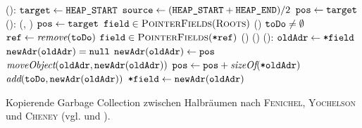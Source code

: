 \begin{algorithm}[h]
\begin{algorithmic}[1]
	\State {}():
	\State \quad $\texttt{target} \gets \texttt{HEAP\_START}$		
	\State \quad $\texttt{source} \gets (\texttt{HEAP\_START} + \texttt{HEAP\_END}) / 2$		
	\State \quad $\texttt{pos} \gets \texttt{target}$		
	\Statex
	\State \Atomic {}():
	\State \quad {}(, )		
	\State \quad $\texttt{pos} \gets \texttt{target}$
	\State \quad \FOREACH $\texttt{field} \in \textsc{PointerFields}(\textsc{Roots})$		
	\State \quad \quad {}()		
	\State \quad \WHILE $\texttt{toDo} \neq \emptyset$		
	\State \quad \quad $\texttt{ref} \gets \textit{remove}(\texttt{toDo})$	
	\State \quad \quad \FOREACH $\texttt{field} \in \textsc{PointerFields}(\texttt{*ref})$
	\State \quad \quad \quad {}()	
	\State \quad {}()
	\Statex
	\State {}():
	\State \quad $\texttt{oldAdr} \gets \texttt{*field}$		
	\State \quad \IF $\texttt{newAdr}(\texttt{oldAdr}) = \texttt{null}$	
	\State \quad \quad $\texttt{newAdr}(\texttt{oldAdr}) \gets \texttt{pos}$		
	\State \quad \quad $\textit{moveObject}(\texttt{oldAdr}, \texttt{newAdr}(\texttt{oldAdr}))$
	\State \quad \quad $\texttt{pos} \gets \texttt{pos} + \textit{sizeOf}(\texttt{*oldAdr})$	
	\State \quad \quad $\textit{add}(\texttt{toDo}, \texttt{newAdr}(\texttt{oldAdr}))$	
	\State \quad $\texttt{*field} \gets \texttt{newAdr}(\texttt{oldAdr})$	
\end{algorithmic}
\caption[Kopierende Garbage Collection nach \textsc{Fenichel}, \textsc{Yochelson} und \textsc{Cheney}]{Kopierende Garbage Collection zwischen Halbräumen nach \textsc{Fenichel}, \textsc{Yochelson} und \textsc{Cheney} (vgl. \cite{fenichel1969} und \cite{cheney1970}).}
\label{algo:copying-gc}
\end{algorithm}

